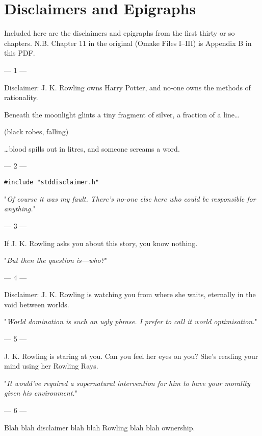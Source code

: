 \chapter{Disclaimers and Epigraphs}

Included here are the disclaimers and epigraphs from the first thirty or so chapters. N.B. Chapter 11 in the original (Omake Files I–III) is Appendix B in this PDF.

{%
\setlength{\parindent}{0pt}
\setlength{\parskip}{1em}

\filbreak
--- 1 ---

Disclaimer: J. K. Rowling owns Harry Potter, and no-one owns the methods of rationality.

\begin{em}
Beneath the moonlight glints a tiny fragment of silver, a fraction of a line{\ldots}

(black robes, falling)

{\ldots}blood spills out in litres, and someone screams a word.
\end{em}

\filbreak
--- 2 ---

\texttt{\#include "stddisclaimer.h"}

"\emph{Of course it was my fault. There’s no-one else here who could be responsible for anything.}"

\filbreak
--- 3 ---

If J. K. Rowling asks you about this story, you know nothing.

"\emph{But then the question is---who?}"

\filbreak
--- 4 ---

Disclaimer: J. K. Rowling is watching you from where she waits, eternally in the void between worlds.

"\emph{World domination is such an ugly phrase. I prefer to call it world optimisation.}"

\filbreak
--- 5 ---

J. K. Rowling is staring at you. Can you feel her eyes on you? She’s reading your mind using her Rowling Rays.

"\emph{It would’ve required a \emph{supernatural intervention} for him to have \emph{your} morality given \emph{his} environment.}"

\filbreak
--- 6 ---

Blah blah disclaimer blah blah Rowling blah blah ownership.

}
